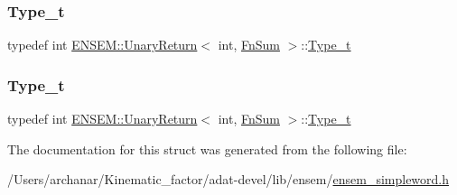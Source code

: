 \mbox{\label{structENSEM_1_1UnaryReturn_3_01int_00_01FnSum_01_4_a0a0ed560534b6f9b4671d7bde05b28dc}} 
\subsubsection{\texorpdfstring{Type\_t}{Type\_t}\hspace{0.1cm}{\footnotesize\ttfamily [2/3]}}
{\footnotesize\ttfamily typedef int \mbox{\hyperlink{structENSEM_1_1UnaryReturn}{E\+N\+S\+E\+M\+::\+Unary\+Return}}$<$ int, \mbox{\hyperlink{structENSEM_1_1FnSum}{Fn\+Sum}} $>$\+::\mbox{\hyperlink{structENSEM_1_1UnaryReturn_3_01int_00_01FnSum_01_4_a0a0ed560534b6f9b4671d7bde05b28dc}{Type\+\_\+t}}}

\mbox{\label{structENSEM_1_1UnaryReturn_3_01int_00_01FnSum_01_4_a0a0ed560534b6f9b4671d7bde05b28dc}} 
\subsubsection{\texorpdfstring{Type\_t}{Type\_t}\hspace{0.1cm}{\footnotesize\ttfamily [3/3]}}
{\footnotesize\ttfamily typedef int \mbox{\hyperlink{structENSEM_1_1UnaryReturn}{E\+N\+S\+E\+M\+::\+Unary\+Return}}$<$ int, \mbox{\hyperlink{structENSEM_1_1FnSum}{Fn\+Sum}} $>$\+::\mbox{\hyperlink{structENSEM_1_1UnaryReturn_3_01int_00_01FnSum_01_4_a0a0ed560534b6f9b4671d7bde05b28dc}{Type\+\_\+t}}}



The documentation for this struct was generated from the following file\+:\begin{DoxyCompactItemize}
\item 
/\+Users/archanar/\+Kinematic\+\_\+factor/adat-\/devel/lib/ensem/\mbox{\hyperlink{adat-devel_2lib_2ensem_2ensem__simpleword_8h}{ensem\+\_\+simpleword.\+h}}\end{DoxyCompactItemize}
